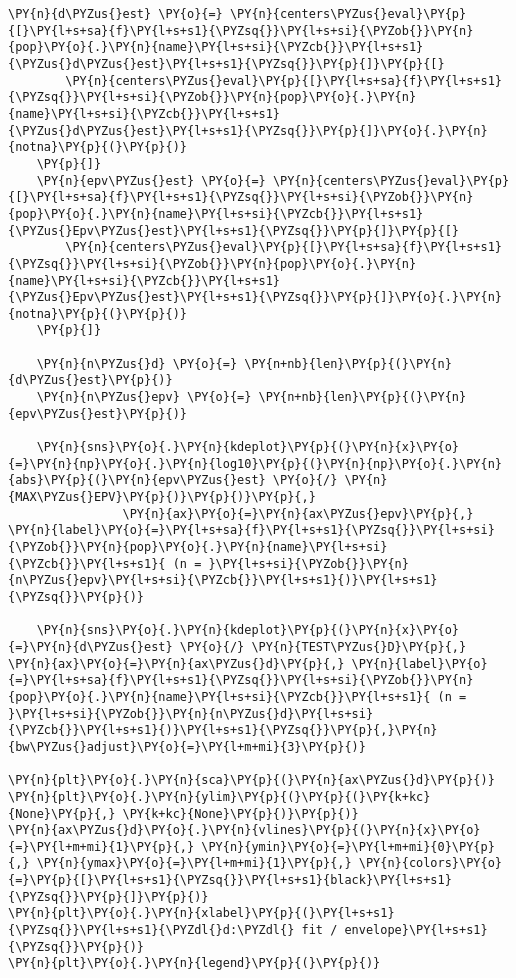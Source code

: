 \begin{tcolorbox}[breakable, size=fbox, boxrule=1pt, pad at break*=1mm,colback=cellbackground, colframe=cellborder]
\begin{Verbatim}[commandchars=\\\{\}]
    \PY{n}{d\PYZus{}est} \PY{o}{=} \PY{n}{centers\PYZus{}eval}\PY{p}{[}\PY{l+s+sa}{f}\PY{l+s+s1}{\PYZsq{}}\PY{l+s+si}{\PYZob{}}\PY{n}{pop}\PY{o}{.}\PY{n}{name}\PY{l+s+si}{\PYZcb{}}\PY{l+s+s1}{\PYZus{}d\PYZus{}est}\PY{l+s+s1}{\PYZsq{}}\PY{p}{]}\PY{p}{[}
        \PY{n}{centers\PYZus{}eval}\PY{p}{[}\PY{l+s+sa}{f}\PY{l+s+s1}{\PYZsq{}}\PY{l+s+si}{\PYZob{}}\PY{n}{pop}\PY{o}{.}\PY{n}{name}\PY{l+s+si}{\PYZcb{}}\PY{l+s+s1}{\PYZus{}d\PYZus{}est}\PY{l+s+s1}{\PYZsq{}}\PY{p}{]}\PY{o}{.}\PY{n}{notna}\PY{p}{(}\PY{p}{)}
    \PY{p}{]}
    \PY{n}{epv\PYZus{}est} \PY{o}{=} \PY{n}{centers\PYZus{}eval}\PY{p}{[}\PY{l+s+sa}{f}\PY{l+s+s1}{\PYZsq{}}\PY{l+s+si}{\PYZob{}}\PY{n}{pop}\PY{o}{.}\PY{n}{name}\PY{l+s+si}{\PYZcb{}}\PY{l+s+s1}{\PYZus{}Epv\PYZus{}est}\PY{l+s+s1}{\PYZsq{}}\PY{p}{]}\PY{p}{[}
        \PY{n}{centers\PYZus{}eval}\PY{p}{[}\PY{l+s+sa}{f}\PY{l+s+s1}{\PYZsq{}}\PY{l+s+si}{\PYZob{}}\PY{n}{pop}\PY{o}{.}\PY{n}{name}\PY{l+s+si}{\PYZcb{}}\PY{l+s+s1}{\PYZus{}Epv\PYZus{}est}\PY{l+s+s1}{\PYZsq{}}\PY{p}{]}\PY{o}{.}\PY{n}{notna}\PY{p}{(}\PY{p}{)}
    \PY{p}{]}

    \PY{n}{n\PYZus{}d} \PY{o}{=} \PY{n+nb}{len}\PY{p}{(}\PY{n}{d\PYZus{}est}\PY{p}{)}
    \PY{n}{n\PYZus{}epv} \PY{o}{=} \PY{n+nb}{len}\PY{p}{(}\PY{n}{epv\PYZus{}est}\PY{p}{)}

    \PY{n}{sns}\PY{o}{.}\PY{n}{kdeplot}\PY{p}{(}\PY{n}{x}\PY{o}{=}\PY{n}{np}\PY{o}{.}\PY{n}{log10}\PY{p}{(}\PY{n}{np}\PY{o}{.}\PY{n}{abs}\PY{p}{(}\PY{n}{epv\PYZus{}est} \PY{o}{/} \PY{n}{MAX\PYZus{}EPV}\PY{p}{)}\PY{p}{)}\PY{p}{,}
                \PY{n}{ax}\PY{o}{=}\PY{n}{ax\PYZus{}epv}\PY{p}{,} \PY{n}{label}\PY{o}{=}\PY{l+s+sa}{f}\PY{l+s+s1}{\PYZsq{}}\PY{l+s+si}{\PYZob{}}\PY{n}{pop}\PY{o}{.}\PY{n}{name}\PY{l+s+si}{\PYZcb{}}\PY{l+s+s1}{ (n = }\PY{l+s+si}{\PYZob{}}\PY{n}{n\PYZus{}epv}\PY{l+s+si}{\PYZcb{}}\PY{l+s+s1}{)}\PY{l+s+s1}{\PYZsq{}}\PY{p}{)}

    \PY{n}{sns}\PY{o}{.}\PY{n}{kdeplot}\PY{p}{(}\PY{n}{x}\PY{o}{=}\PY{n}{d\PYZus{}est} \PY{o}{/} \PY{n}{TEST\PYZus{}D}\PY{p}{,} \PY{n}{ax}\PY{o}{=}\PY{n}{ax\PYZus{}d}\PY{p}{,} \PY{n}{label}\PY{o}{=}\PY{l+s+sa}{f}\PY{l+s+s1}{\PYZsq{}}\PY{l+s+si}{\PYZob{}}\PY{n}{pop}\PY{o}{.}\PY{n}{name}\PY{l+s+si}{\PYZcb{}}\PY{l+s+s1}{ (n = }\PY{l+s+si}{\PYZob{}}\PY{n}{n\PYZus{}d}\PY{l+s+si}{\PYZcb{}}\PY{l+s+s1}{)}\PY{l+s+s1}{\PYZsq{}}\PY{p}{,}\PY{n}{bw\PYZus{}adjust}\PY{o}{=}\PY{l+m+mi}{3}\PY{p}{)}

\PY{n}{plt}\PY{o}{.}\PY{n}{sca}\PY{p}{(}\PY{n}{ax\PYZus{}d}\PY{p}{)}
\PY{n}{plt}\PY{o}{.}\PY{n}{ylim}\PY{p}{(}\PY{p}{(}\PY{k+kc}{None}\PY{p}{,} \PY{k+kc}{None}\PY{p}{)}\PY{p}{)}
\PY{n}{ax\PYZus{}d}\PY{o}{.}\PY{n}{vlines}\PY{p}{(}\PY{n}{x}\PY{o}{=}\PY{l+m+mi}{1}\PY{p}{,} \PY{n}{ymin}\PY{o}{=}\PY{l+m+mi}{0}\PY{p}{,} \PY{n}{ymax}\PY{o}{=}\PY{l+m+mi}{1}\PY{p}{,} \PY{n}{colors}\PY{o}{=}\PY{p}{[}\PY{l+s+s1}{\PYZsq{}}\PY{l+s+s1}{black}\PY{l+s+s1}{\PYZsq{}}\PY{p}{]}\PY{p}{)}
\PY{n}{plt}\PY{o}{.}\PY{n}{xlabel}\PY{p}{(}\PY{l+s+s1}{\PYZsq{}}\PY{l+s+s1}{\PYZdl{}d:\PYZdl{} fit / envelope}\PY{l+s+s1}{\PYZsq{}}\PY{p}{)}
\PY{n}{plt}\PY{o}{.}\PY{n}{legend}\PY{p}{(}\PY{p}{)}


\end{Verbatim}
\end{tcolorbox}

